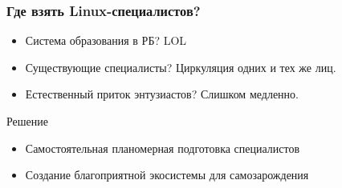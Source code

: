 \begin{frame}
	\frametitle{Где взять Linux-специалистов?}

	\begin{block}{}
		\begin{itemize}
			\item Система образования в РБ? 
				LOL
				\pause
			\item Существующие специалисты?
				Циркуляция одних и тех же лиц.
				\pause
			\item Естественный приток энтузиастов?
				Слишком медленно.
		\end{itemize}
	\end{block}

	\begin{block}{Решение}
		\begin{itemize}
			\item Самостоятельная планомерная подготовка специалистов
			\item Создание благоприятной экосистемы для самозарождения
		\end{itemize}

	\end{block}
\end{frame}

